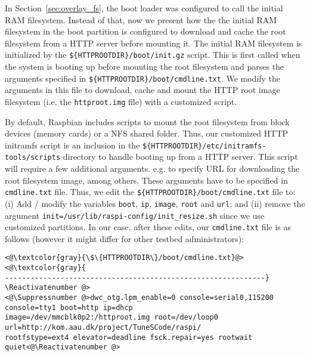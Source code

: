 In Section~\ref{sec:overlay_fs}, the boot loader was configured to call
the initial \ac{RAM} filesystem. Instead of that, now we present how the
the initial \ac{RAM} filesystem in the boot partition is configured to
download and cache the root filesystem from a \ac{HTTP} server before
mounting it. The initial \ac{RAM} filesystem is initialized by the
\texttt{\$\{HTTPROOTDIR\}/boot/init.gz} script. This is first called
when the system is booting up before mounting the root filesystem and
parses the arguments specified in \texttt{\$\{HTTPROOTDIR\}/boot/cmdline.txt}.
We modify the arguments in this file to download, cache and mount the
\ac{HTTP} root image filesystem (i.e. the \texttt{httproot.img} file) with a
customized script.

By default, Raspbian includes scripts to mount the
root filesystem from block devices (memory cards) or a \ac{NFS} shared folder.
Thus, our customized \ac{HTTP} initramfs script is an inclusion in the
\texttt{\$\{HTTPROOTDIR\}/etc/initramfs-tools/scripts} directory to handle
booting up from a \ac{HTTP} server. This script will require a few
additional arguments. e.g. to specify \ac{URL} for downloading the root
filesystem image, among others. These arguments have to be specified in
\texttt{cmdline.txt} file. Thus, we edit the
\texttt{\$\{HTTPROOTDIR\}/boot/cmdline.txt} file to: (i) Add / modify
the variables \texttt{boot}, \texttt{ip}, \texttt{image},
\texttt{root} and \texttt{url}; and (ii) remove the argument
\texttt{init=/usr/lib/raspi-config/init\_resize.sh} since we use customized
partitions. In our case, after these edits, our \texttt{cmdline.txt} file
is as follows (however it might differ for other testbed administrators):

\Suppressnumber\begin{lstlisting}[]
<@\textcolor{gray}{\$\{HTTPROOTDIR\}/boot/cmdline.txt}@>
<@\textcolor{gray}{
-------------------------------------------------------------}
\Reactivatenumber @>
<@\Suppressnumber @>dwc_otg.lpm_enable=0 console=serial0,115200 console=tty1 boot=http ip=dhcp
image=/dev/mmcblk0p2:/httproot.img root=/dev/loop0 url=http://kom.aau.dk/project/TuneSCode/raspi/
rootfstype=ext4 elevator=deadline fsck.repair=yes rootwait quiet<@\Reactivatenumber @>
\end{lstlisting}
\FloatBarrier
\vspace{-5mm}

